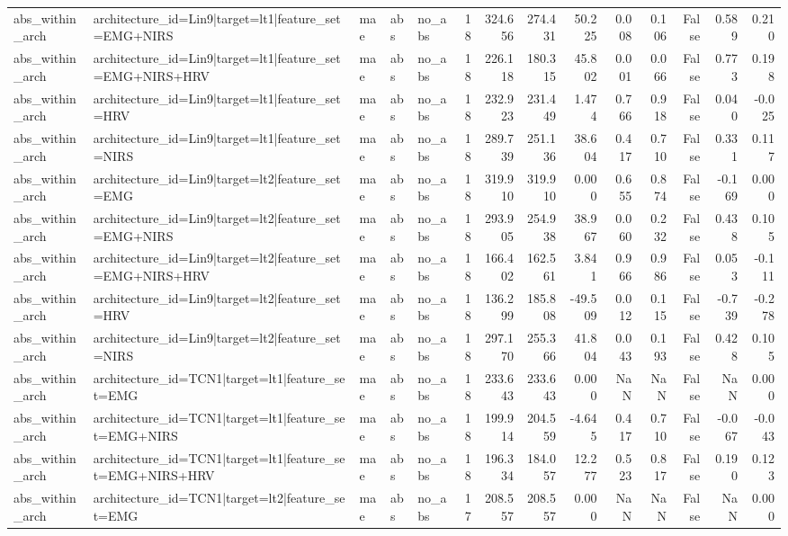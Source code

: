 \begin{table}
\begin{tabular}{lllllrrrrrrrrr}
abs_within_arch & architecture_id=Lin9|target=lt1|feature_set=EMG+NIRS & mae & abs & no_abs & 18 & 324.656 & 274.431 & 50.225 & 0.008 & 0.106 & False & 0.589 & 0.210 \\
abs_within_arch & architecture_id=Lin9|target=lt1|feature_set=EMG+NIRS+HRV & mae & abs & no_abs & 18 & 226.118 & 180.315 & 45.802 & 0.001 & 0.066 & False & 0.773 & 0.198 \\
abs_within_arch & architecture_id=Lin9|target=lt1|feature_set=HRV & mae & abs & no_abs & 18 & 232.923 & 231.449 & 1.474 & 0.766 & 0.918 & False & 0.040 & -0.025 \\
abs_within_arch & architecture_id=Lin9|target=lt1|feature_set=NIRS & mae & abs & no_abs & 18 & 289.739 & 251.136 & 38.604 & 0.417 & 0.710 & False & 0.331 & 0.117 \\
abs_within_arch & architecture_id=Lin9|target=lt2|feature_set=EMG & mae & abs & no_abs & 18 & 319.910 & 319.910 & 0.000 & 0.655 & 0.874 & False & -0.169 & 0.000 \\
abs_within_arch & architecture_id=Lin9|target=lt2|feature_set=EMG+NIRS & mae & abs & no_abs & 18 & 293.905 & 254.938 & 38.967 & 0.060 & 0.232 & False & 0.438 & 0.105 \\
abs_within_arch & architecture_id=Lin9|target=lt2|feature_set=EMG+NIRS+HRV & mae & abs & no_abs & 18 & 166.402 & 162.561 & 3.841 & 0.966 & 0.986 & False & 0.053 & -0.111 \\
abs_within_arch & architecture_id=Lin9|target=lt2|feature_set=HRV & mae & abs & no_abs & 18 & 136.299 & 185.808 & -49.509 & 0.012 & 0.115 & False & -0.739 & -0.278 \\
abs_within_arch & architecture_id=Lin9|target=lt2|feature_set=NIRS & mae & abs & no_abs & 18 & 297.170 & 255.366 & 41.804 & 0.043 & 0.193 & False & 0.428 & 0.105 \\
abs_within_arch & architecture_id=TCN1|target=lt1|feature_set=EMG & mae & abs & no_abs & 18 & 233.643 & 233.643 & 0.000 & NaN & NaN & False & NaN & 0.000 \\
abs_within_arch & architecture_id=TCN1|target=lt1|feature_set=EMG+NIRS & mae & abs & no_abs & 18 & 199.914 & 204.559 & -4.645 & 0.417 & 0.710 & False & -0.067 & -0.043 \\
abs_within_arch & architecture_id=TCN1|target=lt1|feature_set=EMG+NIRS+HRV & mae & abs & no_abs & 18 & 196.334 & 184.057 & 12.277 & 0.523 & 0.817 & False & 0.190 & 0.123 \\
abs_within_arch & architecture_id=TCN1|target=lt2|feature_set=EMG & mae & abs & no_abs & 17 & 208.557 & 208.557 & 0.000 & NaN & NaN & False & NaN & 0.000 \\

\end{tabular}
\end{table}
